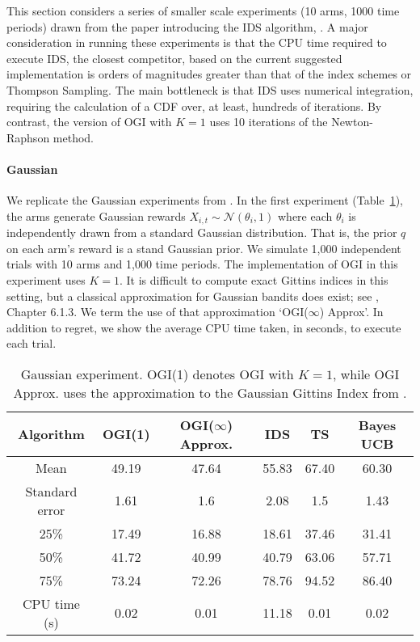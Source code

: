 This section considers a series of smaller scale experiments (10 arms, 1000 time periods) drawn from the paper introducing the IDS algorithm, \citep{russo2014learning}. A major consideration in running these experiments is that the CPU time required to execute IDS, the closest competitor, based on the current suggested implementation is orders of magnitudes greater than that of the index schemes or Thompson Sampling. The main bottleneck is that IDS uses numerical integration, requiring the calculation of a CDF over, at least, hundreds of iterations. By contrast, the version of OGI with $K=1$ uses 10 iterations of the Newton-Raphson method. 

\paragraph{Gaussian}We replicate the Gaussian experiments from \cite{russo2014learning}. In the first experiment (Table~\ref{table:gaussian_experiment1}), the arms generate Gaussian rewards  $X_{i,t} \sim \mathcal{N}(\theta_i, 1)$ where each $\theta_i$ is independently drawn from a standard Gaussian distribution. {\color{blue}That is, the prior $q$ on each arm's reward is a stand Gaussian prior.} We simulate 1,000 independent trials with 10 arms and 1,000 time periods. The implementation of OGI in this experiment uses $K = 1$. It is difficult to compute exact Gittins indices in this setting, but a classical approximation for Gaussian bandits does exist; see \cite{powell2012optimal}, Chapter 6.1.3. We term the use of that approximation `OGI($\infty$) Approx'.  In addition to regret, we  show the average CPU time taken, in seconds, to execute each trial.

\begin{table}[h!]
	\centering
	\begin{tabular}{cccccc} \toprule
		\textbf{Algorithm}  & \textbf{OGI(1)} & \textbf{OGI($\infty$) Approx.} & \textbf{IDS} & \textbf{TS} & \textbf{Bayes UCB}\\ \midrule
		Mean   & 49.19 & 47.64  &  55.83 & 67.40 & 60.30  \\ 
		Standard error  & 1.61 & 1.6 & 2.08 & 1.5 & 1.43 \\ 
		25\%  & 17.49 & 16.88  & 18.61 & 37.46 & 31.41 \\
		50\%   & 41.72 & 40.99 & 40.79 & 63.06 & 57.71 \\ 
		75\%  & 73.24 & 72.26 & 78.76 & 94.52 & 86.40 \\ 
		CPU time (s) & 0.02 & 0.01 & 11.18 & 0.01 & 0.02 \\
		\bottomrule
	\end{tabular}
	\caption[Table caption text]{Gaussian experiment. OGI(1) denotes OGI with $K =1$, while OGI Approx. uses the approximation to the Gaussian Gittins Index from \cite{powell2012optimal}.}
	\label{table:gaussian_experiment1}
\end{table}

